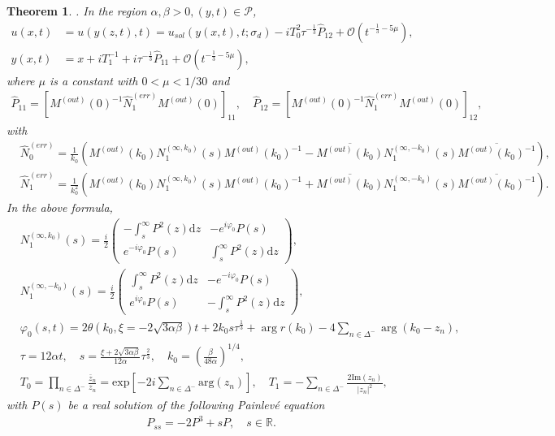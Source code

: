 \documentclass[11pt]{article}
\numberwithin{equation}{section}
\newtheorem{theorem}{Theorem}
\begin{document}
\begin{theorem}
\noindent\textbf{\textup{ \uppercase\expandafter{}}}. In the region $\alpha, \beta>0,(y,t)\in\mathcal{P}$,
\begin{align*}
    u(x,t)&=u(y(z,t),t)=u_{sol}(y(x,t), t;\sigma_d)-iT_0^{2}\tau^{-\frac{1}{3}}\widehat P_{12}+\mathcal{O}(t^{-\frac{1}{3}-5\mu}),\\
    y(x,t)&=x+iT_1^{-1}+i\tau^{-\frac{1}{3}}\widehat P_{11}+\mathcal{O}(t^{-\frac{1}{3}-5\mu}),
\end{align*}
where $\mu$ is a constant with $0<\mu<1/30$ and
\begin{align*}
    \widehat P_{11}=\left[ M^{(out)}(0)^{-1}\widehat N^{(err)}_1 M^{(out)}(0) \right]_{11},\quad \widehat P_{12}=\left[ M^{(out)}(0)^{-1}\widehat N^{(err)}_1 M^{(out)}(0) \right]_{12},
\end{align*}
with
\begin{align*}
&\widehat N^{(err)}_0=\frac{1}{k_0} \left(M^{(out)}(k_0)N^{(\infty,k_0)}_1(s)M^{(out)}(k_0)^{-1}
        -\overline{M^{(out)}(k_0)}N^{(\infty,-k_0)}_1(s)\overline{M^{(out)}(k_0)^{-1}}\right),\\
        &\widehat N^{(err)}_1=\frac{1}{k_0^2}\left(M^{(out)}(k_0)N^{(\infty,k_0)}_1(s)M^{(out)}(k_0)^{-1}+\overline{M^{(out)}(k_0)}N^{(\infty,-k_0)}_1(s)\overline{M^{(out)}(k_0)^{-1}}\right).
\end{align*}
In the above formula,
\begin{align*}
&N_1^{(\infty,k_0)} ( s)
=   \frac{{i}}{2} \begin{pmatrix}
-\int_s^\infty P^2(z)\mathrm{d}z &- e^{i\varphi_0 }P(s) \\  e^{-i\varphi_0 }P(s) &   \int_s^\infty P^2(z)\mathrm{d}z
 \end{pmatrix},\\
 &N_1^{(\infty,-k_0)} ( s)
= \frac{{i}}{2} \begin{pmatrix}
  \int_s^\infty P^2(z)\mathrm{d}z &- e^{-i\varphi_0 }P(s) \\  e^{i\varphi_0 }P(s) &-\int_s^\infty P^2(z)\mathrm{d}z
 \end{pmatrix}, \\
&\varphi_0(s,t)=2\theta(k_0,\xi=-2\sqrt{3\alpha\beta})t+2k_0s\tau^{\frac{1}{3}}+\arg r(k_0)-4\sum_{n\in\Delta^-}\arg(k_0-z_n),\\
&\tau=12\alpha t,\quad s=\frac{\xi+2\sqrt{3\alpha\beta}}{12\alpha}\tau^{\frac{2}{3}},\quad k_0=\left(\frac{\beta}{48\alpha}\right)^{1/4},\\
&T_0=\prod\limits_{n\in\Delta^-}\frac{\bar{z}_n}{z_n}=\mathrm{exp}\left[-2i\sum_{n\in\Delta^-}\mathrm{arg}(z_n)\right],\quad T_1=-\sum_{n\in\Delta^-}\frac{2\mathrm{Im}(z_n)}{|z_n|^2},
\end{align*}
with $P(s)$ be a real solution of the following Painlev\'{e} \textup{\uppercase\expandafter{} }equation
\begin{align*}
	P_{ss} =-2P^3 +sP, \quad s \in \mathbb{R}.
\end{align*}




\end{theorem}
\end{document}
